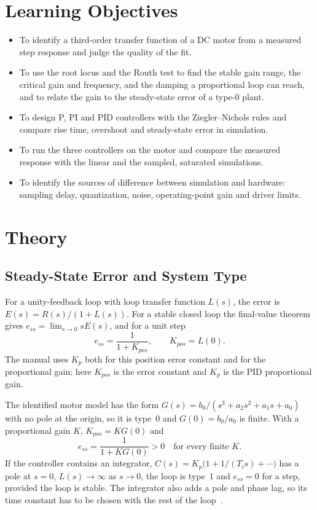 \documentclass[lettersize,journal]{IEEEtran}
\begin{document}
\section{Learning Objectives}
\begin{itemize}
\item To identify a third-order transfer function of a DC motor from a measured step response and judge the quality of the fit.
\item To use the root locus and the Routh test to find the stable gain range, the critical gain and frequency, and the damping a proportional loop can reach, and to relate the gain to the steady-state error of a type-0 plant.
\item To design P, PI and PID controllers with the Ziegler--Nichols rules and compare rise time, overshoot and steady-state error in simulation.
\item To run the three controllers on the motor and compare the measured response with the linear and the sampled, saturated simulations.
\item To identify the sources of difference between simulation and hardware: sampling delay, quantization, noise, operating-point gain and driver limits.
\end{itemize}

\section{Theory}

\subsection{Steady-State Error and System Type}
\label{sec:ess}
For a unity-feedback loop with loop transfer function $L(s)$, the error is $E(s)=R(s)/(1+L(s))$. For a stable closed loop the final-value theorem gives $e_{ss}=\lim_{s\to0}sE(s)$, and for a unit step
\begin{equation}
e_{ss}=\frac{1}{1+K_{pos}},\qquad K_{pos}=L(0).
\label{eq:ess}
\end{equation}
The manual uses $K_p$ both for this position error constant and for the proportional gain; here $K_{pos}$ is the error constant and $K_p$ is the PID proportional gain.

The identified motor model has the form $G(s)=b_0/(s^3+a_2s^2+a_1s+a_0)$ with no pole at the origin, so it is type~0 and $G(0)=b_0/a_0$ is finite. With a proportional gain $K$, $K_{pos}=KG(0)$ and
\begin{equation}
e_{ss}=\frac{1}{1+KG(0)}>0\quad\text{for every finite }K.
\label{eq:essP}
\end{equation}
If the controller contains an integrator, $C(s)=K_p\bigl(1+1/(T_is)+\cdots\bigr)$ has a pole at $s=0$, $L(s)\to\infty$ as $s\to0$, the loop is type~1 and $e_{ss}=0$ for a step, provided the loop is stable. The integrator also adds a pole and phase lag, so its time constant has to be chosen with the rest of the loop~\cite{ogata,franklin}.
\end{document}
